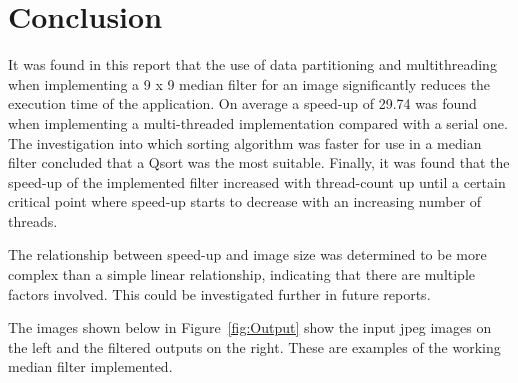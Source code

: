 \section{Conclusion}
It was found in this report that the use of data partitioning and multithreading when implementing a 9 x 9 median filter for an image significantly reduces the execution time of the application. On average a speed-up of 29.74 was found when implementing a multi-threaded implementation compared with a serial one. The investigation into which sorting algorithm was faster for use in a median filter concluded that a Qsort was the most suitable. Finally, it was found that the speed-up of the implemented filter increased with thread-count up until a certain critical point where speed-up starts to decrease with an increasing number of threads.

The relationship between speed-up and image size was determined to be more complex than a simple linear relationship, indicating that there are multiple factors involved. This could be investigated further in future reports.


The images shown below in Figure~\ref{fig:Output} show the input jpeg images on the left and the filtered outputs on the right. These are examples of the working median filter implemented.